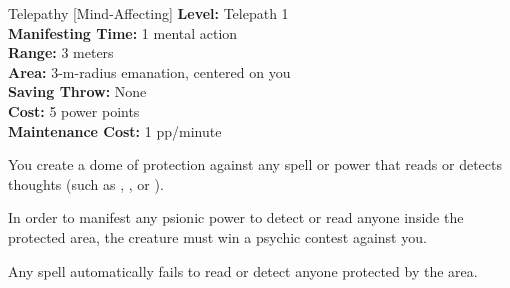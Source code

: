 {Telepathy [Mind-Affecting]}
{
	\textbf{Level:}
	Telepath 1\\
	\textbf{Manifesting Time:}
	1 mental action\\
	\textbf{Range:}
	3 meters\\
	\textbf{Area:}
	3-m-radius emanation, centered on you\\
	\textbf{Saving Throw:}
	None\\
	\textbf{Cost:}
	5 power points\\
	\textbf{Maintenance Cost:}
	1 pp/minute\\
}
{
	You create a dome of protection against any spell or power that reads or detects thoughts (such as , , or ).

	In order to manifest any psionic power to detect or read anyone inside the protected area, the creature must win a psychic contest against you.

	Any spell automatically fails to read or detect anyone protected by the area.
}
